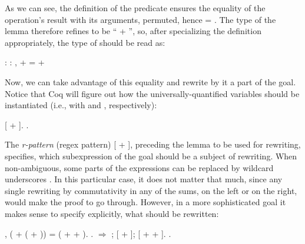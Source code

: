 \coqdocemptyline


As we can see, the definition of the  predicate ensures
the equality of the operation's result with its arguments, permuted,
hence    =   . The type of the lemma  therefore
refines  to be ``\coqdocvar{\_} + \coqdocvar{\_}'', so, after specializing the definition
appropriately, the type of  should be read as:


\coqdoceol
\coqdocemptyline
\coqdocnoindent
{}\coqdoceol
\coqdocindent{2.50em}
: \coqdockw{\ensuremath{\forall}}  : ,  +  =  + 

\coqdocemptyline


Now, we can take advantage of this equality and rewrite by it a part
of the goal. Notice that Coq will figure out how the
universally-quantified variables should be instantiated (i.e., with
 and , respectively):


\begin{coqdoccode}
\coqdocemptyline
\coqdocnoindent
{}  [ + \coqdocvar{\_}].\coqdoceol
\coqdocnoindent
{}.\coqdoceol
\coqdocemptyline
\end{coqdoccode}


The \textit{r-pattern}  (regex pattern) [ + \coqdocvar{\_}],
preceding the lemma to be used for rewriting, specifies, which
subexpression of the goal should be a subject of rewriting. When
non-ambiguous, some parts of the expressions can be replaced by
wildcard  underscores \coqdocvar{\_}. In this particular case,
it does not matter that much, since any single rewriting by
commutativity in any of the sums, on the left or on the right, would
make the proof to go through. However, in a more sophisticated goal it
makes sense to specify explicitly, what should be rewritten:


\begin{coqdoccode}
\coqdocemptyline
\coqdocnoindent
{} \coqdockw{\ensuremath{\forall}}   , ( + ( + )) = ( +  + ).\coqdoceol
\coqdocnoindent
{}.\coqdoceol
\coqdocnoindent
{} \ensuremath{\Rightarrow}  ;  [ + \coqdocvar{\_}];  [ + \coqdocvar{\_} + \coqdocvar{\_}].\coqdoceol
\coqdocnoindent
{}.\coqdoceol
\coqdocemptyline
\end{coqdoccode}


